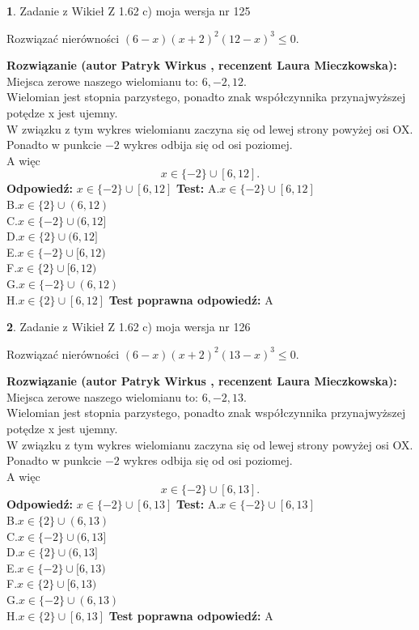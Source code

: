 \documentclass[12pt, a4paper]{article}
\theoremstyle{definition} %
\newtheorem{zad}{}
\newcommand{\zadStart}[1]{\begin{zad}#1\newline}
\newcommand{\zadStop}{\end{zad}}
\newcommand{\rozwStart}[2]{\noindent \textbf{Rozwiązanie (autor #1 , recenzent #2): }\newline}
\newcommand{\rozwStop}{\newline}
\newcommand{\odpStart}{\noindent \textbf{Odpowiedź:}\newline}
\newcommand{\odpStop}{\newline}
\newcommand{\testStart}{\noindent \textbf{Test:}\newline}
\newcommand{\testStop}{\newline}
\newcommand{\kluczStart}{\noindent \textbf{Test poprawna odpowiedź:}\newline}
\newcommand{\kluczStop}{\newline}
\begin{document}
\zadStart{Zadanie z Wikieł Z 1.62 c) moja wersja nr 125}

Rozwiązać nierówności $(6-x)(x+2)^{2}(12-x)^{3}\le0$.
\zadStop
\rozwStart{Patryk Wirkus}{Laura Mieczkowska}
Miejsca zerowe naszego wielomianu to: $6, -2, 12$.\\
Wielomian jest stopnia parzystego, ponadto znak współczynnika przy\linebreak najwyższej potędze x jest ujemny.\\ W związku z tym wykres wielomianu zaczyna się od lewej strony powyżej osi OX.\\
Ponadto w punkcie $-2$ wykres odbija się od osi poziomej.\\
A więc $$x \in \{-2\} \cup [6,12].$$
\rozwStop
\odpStart
$x \in \{-2\} \cup [6,12]$
\odpStop
\testStart
A.$x \in \{-2\} \cup [6,12]$\\
B.$x \in \{2\} \cup (6,12)$\\
C.$x \in \{-2\} \cup (6,12]$\\
D.$x \in \{2\} \cup (6,12]$\\
E.$x \in \{-2\} \cup [6,12)$\\
F.$x \in \{2\} \cup [6,12)$\\
G.$x \in \{-2\} \cup (6,12)$\\
H.$x \in \{2\} \cup [6,12]$
\testStop
\kluczStart
A
\kluczStop



\zadStart{Zadanie z Wikieł Z 1.62 c) moja wersja nr 126}

Rozwiązać nierówności $(6-x)(x+2)^{2}(13-x)^{3}\le0$.
\zadStop
\rozwStart{Patryk Wirkus}{Laura Mieczkowska}
Miejsca zerowe naszego wielomianu to: $6, -2, 13$.\\
Wielomian jest stopnia parzystego, ponadto znak współczynnika przy\linebreak najwyższej potędze x jest ujemny.\\ W związku z tym wykres wielomianu zaczyna się od lewej strony powyżej osi OX.\\
Ponadto w punkcie $-2$ wykres odbija się od osi poziomej.\\
A więc $$x \in \{-2\} \cup [6,13].$$
\rozwStop
\odpStart
$x \in \{-2\} \cup [6,13]$
\odpStop
\testStart
A.$x \in \{-2\} \cup [6,13]$\\
B.$x \in \{2\} \cup (6,13)$\\
C.$x \in \{-2\} \cup (6,13]$\\
D.$x \in \{2\} \cup (6,13]$\\
E.$x \in \{-2\} \cup [6,13)$\\
F.$x \in \{2\} \cup [6,13)$\\
G.$x \in \{-2\} \cup (6,13)$\\
H.$x \in \{2\} \cup [6,13]$
\testStop
\kluczStart
A
\kluczStop
\end{document}
